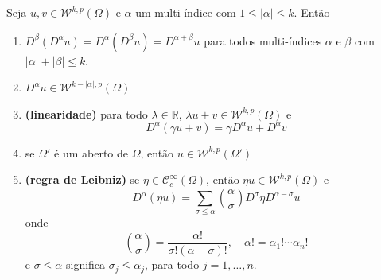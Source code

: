 \documentclass[a4paper, 11pt]{book}
\theoremstyle{definition}
\newcommand{\bR}{\mathbb{R}}
\newcommand{\cC}{\mathcal{C}}
\newcommand{\cW}{\mathcal{W}}
\begin{document}
\begin{tbox} \label{thm:propriedades-derivada-fraca}
    Seja $u, v \in \cW^{k,p}(\Omega)$ e $\alpha$ um multi-índice com $1 \leqslant |\alpha| \leqslant k$.
    Então 
    \begin{enumerate}[leftmargin=*, label=\textbf{(\alph*)}]
        \item $D^\beta(D^\alpha u) = D^\alpha (D^\beta u) = D^{\alpha + \beta} u$ para todos multi-índices $\alpha$ e $\beta$ com $|\alpha| + |\beta| \leqslant k.$
        \item $D^\alpha u \in \cW^{k - |\alpha|,p}(\Omega)$
        \item \textbf{(linearidade)} para todo $\lambda \in \bR$, $\lambda u + v \in \cW^{k,p}(\Omega)$ e
        \[
            D^{\alpha}(\gamma u + v) = \gamma D^\alpha u + D^\alpha v
        \]
        \item se $\Omega'$ é um aberto de $\Omega$, então $u \in \cW^{k,p}(\Omega')$
        \item \textbf{(regra de Leibniz)} se $\eta \in \cC^\infty_c(\Omega)$, então $\eta u \in \cW^{k,p}(\Omega)$ e
        \begin{equation} \label{eq:regra-de-leibniz}
            D^\alpha (\eta u) = \sum_{\sigma \leqslant \alpha} \binom{\alpha}{\sigma} D^{\sigma} \eta D^{\alpha - \sigma} u
        \end{equation}
        onde
        \[
            \binom{\alpha}{\sigma} = \frac{\alpha!}{\sigma!(\alpha - \sigma)!}, \quad \alpha! = \alpha_1!\cdots \alpha_n!
        \]
        e $\sigma \leqslant \alpha$ significa $\sigma_j \leqslant \alpha_j$, para todo $j = 1,\dots,n$.
    \end{enumerate}
\end{tbox}
\end{document}

